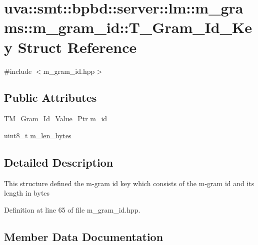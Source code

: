 \hypertarget{structuva_1_1smt_1_1bpbd_1_1server_1_1lm_1_1m__grams_1_1m__gram__id_1_1_t___gram___id___key}{}\section{uva\+:\+:smt\+:\+:bpbd\+:\+:server\+:\+:lm\+:\+:m\+\_\+grams\+:\+:m\+\_\+gram\+\_\+id\+:\+:T\+\_\+\+Gram\+\_\+\+Id\+\_\+\+Key Struct Reference}
\label{structuva_1_1smt_1_1bpbd_1_1server_1_1lm_1_1m__grams_1_1m__gram__id_1_1_t___gram___id___key}


{\ttfamily \#include $<$m\+\_\+gram\+\_\+id.\+hpp$>$}

\subsection*{Public Attributes}
\begin{DoxyCompactItemize}
\item 
\hyperlink{namespaceuva_1_1smt_1_1bpbd_1_1server_1_1lm_1_1m__grams_1_1m__gram__id_aa605051ded9336178d905e9581702378}{T\+M\+\_\+\+Gram\+\_\+\+Id\+\_\+\+Value\+\_\+\+Ptr} \hyperlink{structuva_1_1smt_1_1bpbd_1_1server_1_1lm_1_1m__grams_1_1m__gram__id_1_1_t___gram___id___key_a53b872f5e245de5fda3b7d28b8cdd992}{m\+\_\+id}
\item 
uint8\+\_\+t \hyperlink{structuva_1_1smt_1_1bpbd_1_1server_1_1lm_1_1m__grams_1_1m__gram__id_1_1_t___gram___id___key_ac8042d2fd320179861d548daa08b97d1}{m\+\_\+len\+\_\+bytes}
\end{DoxyCompactItemize}


\subsection{Detailed Description}
This structure defined the m-\/gram id key which consists of the m-\/gram id and its length in bytes 

Definition at line 65 of file m\+\_\+gram\+\_\+id.\+hpp.



\subsection{Member Data Documentation}
\hypertarget{structuva_1_1smt_1_1bpbd_1_1server_1_1lm_1_1m__grams_1_1m__gram__id_1_1_t___gram___id___key_a53b872f5e245de5fda3b7d28b8cdd992}{}
